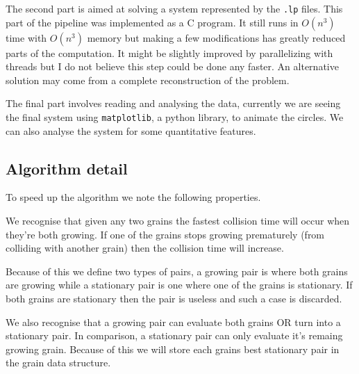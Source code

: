 \documentclass{article}
\begin{document}
The second part is aimed at solving a system represented by the \texttt{.lp}
files. This part of the pipeline was implemented as a C program. It still
runs in $O(n^3)$ time with $O(n^3)$ memory but making a few modifications has
greatly reduced parts of the computation. It might be slightly improved by
parallelizing with threads but I do not believe this step could be done
any faster. An alternative solution may come from a complete reconstruction
of the problem.

The final part involves reading and analysing the data, currently we are
seeing the final system using \texttt{matplotlib}, a python library, to animate
the circles. We can also analyse the system for some quantitative features.

\subsection{Algorithm detail}
To speed up the algorithm we note the following properties.

We recognise that given any two grains the fastest collision time
will occur when they're both growing. If one of the grains stops growing
prematurely (from colliding with another grain) then the collision time
will increase.

Because of this we define two types of pairs, a growing pair is where
both grains are growing while a stationary pair is one where one of the
grains is stationary. If both grains are stationary then the pair is
useless and such a case is discarded.

We also recognise that a growing pair can evaluate both grains OR
turn into a stationary pair. In comparison, a stationary pair can only
evaluate it's remaing growing grain.
Because of this we will store each grains best stationary pair in
the grain data structure.
\end{document}
